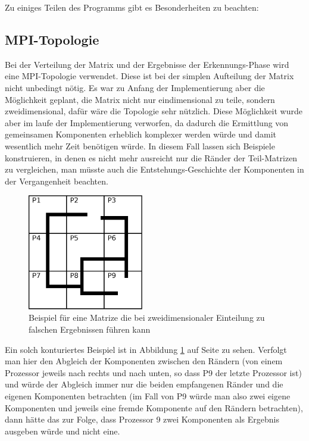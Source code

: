Zu einiges Teilen des Programms gibt es Besonderheiten zu beachten:

\subsection{MPI-Topologie}

Bei der Verteilung der Matrix und der Ergebnisse der Erkennungs-Phase wird eine MPI-Topologie verwendet. Diese ist bei der simplen Aufteilung der Matrix nicht unbedingt nötig. Es war zu Anfang der Implementierung aber die Möglichkeit geplant, die Matrix nicht nur eindimensional zu teile, sondern zweidimensional, dafür wäre die Topologie sehr nützlich. Diese Möglichkeit wurde aber im laufe der Implementierung verworfen, da dadurch die Ermittlung von gemeinsamen Komponenten erheblich komplexer werden würde und damit wesentlich mehr Zeit benötigen würde. In diesem Fall lassen sich Beispiele konstruieren, in denen es nicht mehr ausreicht nur die Ränder der Teil-Matrizen zu vergleichen, man müsste auch die Entstehungs-Geschichte der Komponenten in der Vergangenheit beachten.

\begin{figure}[tbhp]
	\centering
	\includegraphics[width=0.45\textwidth]{images/bordercompare_illegal}
	\caption{Beispiel für eine Matrize die bei zweidimensionaler Einteilung zu falschen Ergebnissen führen kann}
	\label{fig:bcomp_illegal}
\end{figure}

Ein solch konturiertes Beispiel ist in Abbildung \ref{fig:bcomp_illegal} auf Seite \pageref{fig:bcomp_illegal} zu sehen. Verfolgt man hier den Abgleich der Komponenten zwischen den Rändern (von einem Prozessor jeweils nach rechts und nach unten, so dass P9 der letzte Prozessor ist) und würde der Abgleich immer nur die beiden empfangenen Ränder und die eigenen Komponenten betrachten (im Fall von P9 würde man also zwei eigene Komponenten und jeweils eine fremde Komponente auf den Rändern betrachten), dann hätte das zur Folge, dass Prozessor 9 zwei Komponenten als Ergebnis ausgeben würde und nicht eine.

